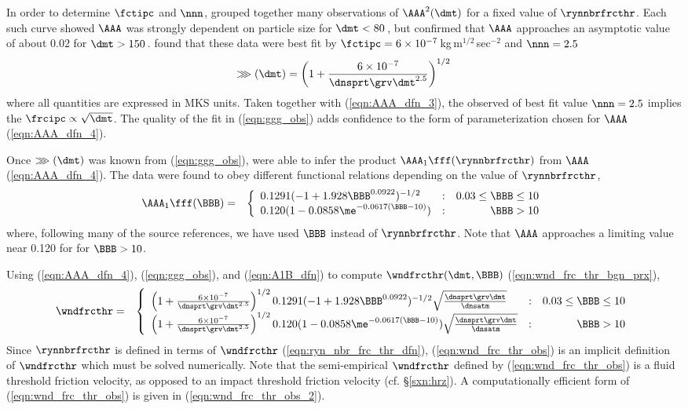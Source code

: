 \documentclass[12pt,twoside]{book}
\begin{document}
In order to determine $\fctipc$ and $\nnn$, \cite{IvW82} grouped
together many observations of $\AAA^{2}(\dmt)$ for a fixed value of
$\rynnbrfrcthr$.  
Each such curve showed $\AAA$ was strongly dependent on particle size
for $\dmt < 80$\,\um, but confirmed that $\AAA$ approaches an
asymptotic value of about $0.02$ for $\dmt > 150$\,\um.
\cite{IvW82} found that these data were best fit by 
$\fctipc = 6 \times 10^{-7}$\,kg\,m$^{1/2}$\,sec$^{-2}$ and $\nnn = 2.5$
\begin{equation}
\ggg(\dmt) = \left( 1 + \frac{6 \times 10^{-7}}{\dnsprt \grv \dmt^{2.5}} \right)^{1/2}
\label{eqn:ggg_obs}
\end{equation}
where all quantities are expressed in MKS units.
Taken together with (\ref{eqn:AAA_dfn_3}), the observed of best fit
value $\nnn = 2.5$ implies the $\frcipc \propto \sqrt{\dmt}$.
The quality of the fit in (\ref{eqn:ggg_obs}) adds confidence to the
form of parameterization chosen for $\AAA$ (\ref{eqn:AAA_dfn_4}).

Once $\ggg(\dmt)$ was known from (\ref{eqn:ggg_obs}), 
\cite{IvW82} were able to infer the product $\AAA_{1}
\fff(\rynnbrfrcthr)$ from $\AAA$ (\ref{eqn:AAA_dfn_4}).
The data were found to obey different functional relations depending
on the value of $\rynnbrfrcthr$,
\begin{eqnarray}
\AAA_{1} \fff(\BBB) & = & \left\{
\begin{array}{l@{\quad:\quad}r}
0.1291 ( -1 + 1.928 \BBB^{0.0922} )^{-1/2} & 0.03 \le \BBB \le 10 \\
0.120 ( 1 - 0.0858 \me^{ -0.0617 ( \BBB - 10 ) } ) & \BBB > 10
\end{array} \right.
\label{eqn:A1B_dfn}
\end{eqnarray}
where, following many of the source references, we have used $\BBB$
instead of $\rynnbrfrcthr$. 
Note that $\AAA$ approaches a limiting value near 0.120 for for $\BBB
> 10$.

Using (\ref{eqn:AAA_dfn_4}), (\ref{eqn:ggg_obs}), and
(\ref{eqn:A1B_dfn}) to compute $\wndfrcthr(\dmt,\BBB)$
(\ref{eqn:wnd_frc_thr_bgn_prx}),
\begin{eqnarray}
\wndfrcthr & = & \left\{
\begin{array}{l@{\quad:\quad}r}
\left( 1 + \frac{6 \times 10^{-7}}{\dnsprt \grv \dmt^{2.5} } \right)^{1/2}
0.1291 ( -1 + 1.928 \BBB^{0.0922} )^{-1/2} 
\sqrt{ \frac{\dnsprt \grv \dmt}{\dnsatm }}
& 0.03 \le \BBB \le 10 \\
\left( 1 + \frac{6 \times 10^{-7}}{\dnsprt \grv \dmt^{2.5} } \right)^{1/2}
0.120 ( 1 - 0.0858 \me^{ -0.0617 ( \BBB - 10 ) } ) 
\sqrt{ \frac{\dnsprt \grv \dmt}{\dnsatm }}
& \BBB > 10
\end{array} \right.
\label{eqn:wnd_frc_thr_obs}
\end{eqnarray}
Since $\rynnbrfrcthr$ is defined in terms of $\wndfrcthr$
(\ref{eqn:ryn_nbr_frc_thr_dfn}), (\ref{eqn:wnd_frc_thr_obs}) is an
implicit definition of $\wndfrcthr$ which must be solved numerically.
Note that the semi-empirical $\wndfrcthr$ defined by
(\ref{eqn:wnd_frc_thr_obs}) is a fluid threshold friction velocity, as
opposed to an impact threshold friction velocity
(cf. \S\ref{sxn:hrz}). 
A computationally efficient form of (\ref{eqn:wnd_frc_thr_obs}) is
given in (\ref{eqn:wnd_frc_thr_obs_2}).
\end{document}
